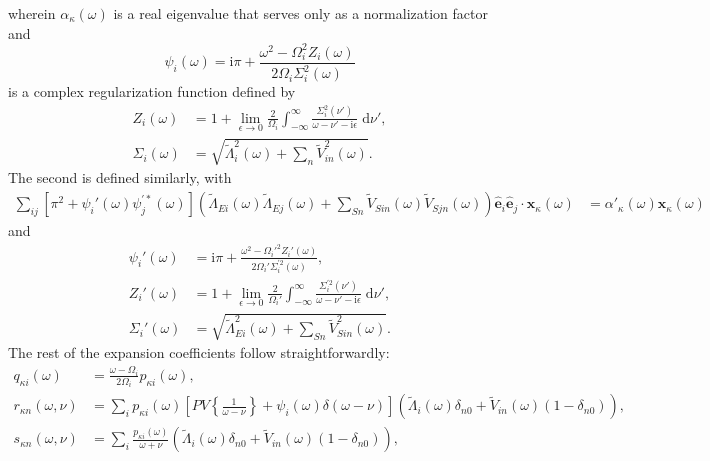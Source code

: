 \documentclass{article}
\begin{document}
wherein $\alpha_\kappa(\omega)$ is a real eigenvalue that serves only as a normalization factor and
\begin{equation}
\psi_i(\omega) = \mathrm{i}\pi + \frac{\omega^2 - \Omega_i^2Z_i(\omega)}{2\Omega_i\Sigma_i^2(\omega)}
\end{equation}
is a complex regularization function defined by
\begin{equation}
\begin{split}
Z_i(\omega) &= 1 + \lim_{\epsilon\to0}\frac{2}{\Omega_i}\int_{-\infty}^\infty\frac{\Sigma_i^2(\nu')}{\omega - \nu' - \mathrm{i}\epsilon}\;\mathrm{d}\nu',\\
\Sigma_i(\omega) &= \sqrt{\tilde{\Lambda}_i^2(\omega) + \sum_n\tilde{V}_{in}^2(\omega)}.
\end{split}
\end{equation}
The second is defined similarly, with
\begin{equation}
\begin{split}
\sum_{ij}\left[\pi^2 + \psi_i'(\omega)\psi_j^{\prime*}(\omega)\right]\left(\tilde{\Lambda}_{Ei}(\omega)\tilde{\Lambda}_{Ej}(\omega) + \sum_{Sn}\tilde{V}_{Sin}(\omega)\tilde{V}_{Sjn}(\omega)\right)\hat{\mathbf{e}}_i\hat{\mathbf{e}}_j\cdot\mathbf{x}_\kappa(\omega) &= \alpha'_\kappa(\omega)\mathbf{x}_\kappa(\omega)
\end{split}
\end{equation}
and
\begin{equation}
\begin{split}
\psi_i'(\omega) &= \mathrm{i}\pi + \frac{\omega^2 - \Omega_i'^2Z_i'(\omega)}{2\Omega_i'\Sigma_i^{\prime2}(\omega)},\\
Z_i'(\omega) &= 1 + \lim_{\epsilon\to0}\frac{2}{\Omega_i'}\int_{-\infty}^\infty\frac{\Sigma_i^{\prime2}(\nu')}{\omega - \nu' - \mathrm{i}\epsilon}\;\mathrm{d}\nu',\\
\Sigma_i'(\omega) &= \sqrt{\tilde{\Lambda}_{Ei}^2(\omega) + \sum_{Sn}\tilde{V}_{Sin}^2(\omega)}.
\end{split}
\end{equation}
The rest of the expansion coefficients follow straightforwardly:
\begin{equation}
\begin{split}
q_{\kappa i}(\omega) &= \frac{\omega - \Omega_i}{2\Omega_i}p_{\kappa i}(\omega),\\
r_{\kappa n}(\omega,\nu) &= \sum_ip_{\kappa i}(\omega)\left[PV\left\{\frac{1}{\omega - \nu}\right\} + \psi_i(\omega)\delta(\omega - \nu)\right]
\left(\tilde{\Lambda}_i(\omega)\delta_{n0} + \tilde{V}_{in}(\omega)(1 - \delta_{n0})\right),\\
s_{\kappa n}(\omega,\nu) &= \sum_i\frac{p_{\kappa i}(\omega)}{\omega + \nu}\left(\tilde{\Lambda}_i(\omega)\delta_{n0} + \tilde{V}_{in}(\omega)(1 - \delta_{n0})\right),
\end{split}
\end{equation}
\end{document}
